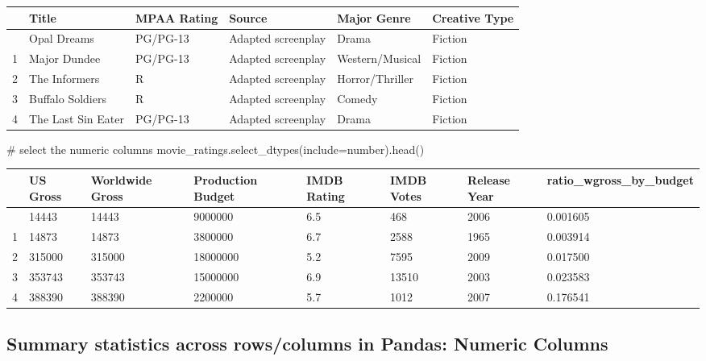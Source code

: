 \documentclass[
  letterpaper,
  DIV=11,
  numbers=noendperiod]{scrreprt}
\newenvironment{Shaded}{\begin{snugshade}}{\end{snugshade}}
\newcommand{\CommentTok}[1]{\textcolor[rgb]{0.37,0.37,0.37}{#1}}
\newcommand{\NormalTok}[1]{\textcolor[rgb]{0.00,0.23,0.31}{#1}}
\newcommand{\OperatorTok}[1]{\textcolor[rgb]{0.37,0.37,0.37}{#1}}
\newcommand{\StringTok}[1]{\textcolor[rgb]{0.13,0.47,0.30}{#1}}
\begin{document}
\begin{longtable}[]{@{}llllll@{}}
\toprule\noalign{}
& Title & MPAA Rating & Source & Major Genre & Creative Type \\
\midrule\noalign{}
\endhead
\bottomrule\noalign{}
\endlastfoot
0 & Opal Dreams & PG/PG-13 & Adapted screenplay & Drama & Fiction \\
1 & Major Dundee & PG/PG-13 & Adapted screenplay & Western/Musical &
Fiction \\
2 & The Informers & R & Adapted screenplay & Horror/Thriller &
Fiction \\
3 & Buffalo Soldiers & R & Adapted screenplay & Comedy & Fiction \\
4 & The Last Sin Eater & PG/PG-13 & Adapted screenplay & Drama &
Fiction \\
\end{longtable}

\begin{Shaded}
\begin{Highlighting}[]
\CommentTok{\# select the numeric columns}
\NormalTok{movie\_ratings.select\_dtypes(include}\OperatorTok{=}\StringTok{\textquotesingle{}number\textquotesingle{}}\NormalTok{).head()}
\end{Highlighting}
\end{Shaded}

\begin{longtable}[]{@{}llllllll@{}}
\toprule\noalign{}
& US Gross & Worldwide Gross & Production Budget & IMDB Rating & IMDB
Votes & Release Year & ratio\_wgross\_by\_budget \\
\midrule\noalign{}
\endhead
\bottomrule\noalign{}
\endlastfoot
0 & 14443 & 14443 & 9000000 & 6.5 & 468 & 2006 & 0.001605 \\
1 & 14873 & 14873 & 3800000 & 6.7 & 2588 & 1965 & 0.003914 \\
2 & 315000 & 315000 & 18000000 & 5.2 & 7595 & 2009 & 0.017500 \\
3 & 353743 & 353743 & 15000000 & 6.9 & 13510 & 2003 & 0.023583 \\
4 & 388390 & 388390 & 2200000 & 5.7 & 1012 & 2007 & 0.176541 \\
\end{longtable}

\hypertarget{summary-statistics-across-rowscolumns-in-pandas-numeric-columns}{%
\subsection{Summary statistics across rows/columns in Pandas: Numeric
Columns}\label{summary-statistics-across-rowscolumns-in-pandas-numeric-columns}}
\end{document}
